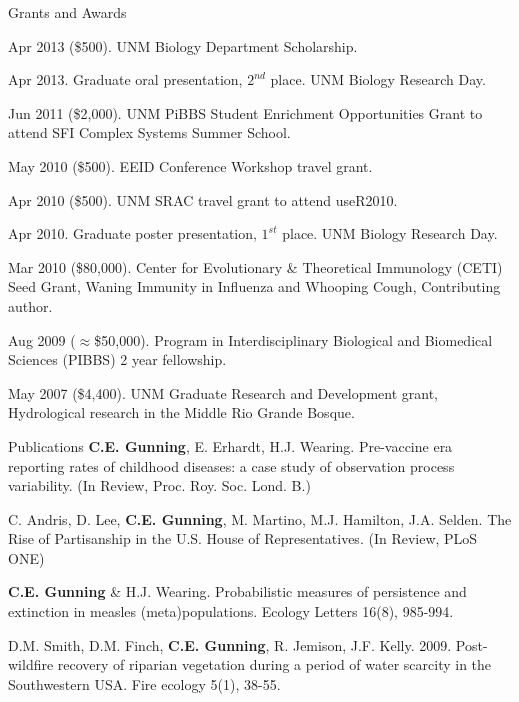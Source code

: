 \documentclass{resume} %
\begin{document}
\begin{rSection}{Grants and Awards}
\item Apr 2013 (\$500). UNM Biology Department Scholarship.
\item Apr 2013. Graduate oral presentation, $2^{nd}$ place. UNM Biology Research Day.
\item Jun 2011 (\$2,000). UNM PiBBS Student Enrichment Opportunities Grant to
attend SFI Complex Systems Summer School.
\item May 2010 (\$500). EEID Conference Workshop travel grant.
\item Apr 2010 (\$500). UNM SRAC travel grant to attend useR2010.
\item Apr 2010.  Graduate poster presentation, $1^{st}$ place. UNM Biology Research Day.
\item Mar 2010 (\$80,000). Center for Evolutionary \& Theoretical Immunology (CETI) Seed
Grant, Waning Immunity in Influenza and Whooping Cough,
Contributing author.
\item Aug 2009 ($\approx$\$50,000). Program in Interdisciplinary Biological and Biomedical
Sciences (PIBBS) 2 year fellowship.
\item May 2007 (\$4,400). UNM Graduate Research and Development grant, Hydrological
research in the Middle Rio Grande Bosque. 
\end{rSection}

\begin{rSection}{Publications}
{\bf C.E. Gunning}, E. Erhardt, H.J. Wearing.  Pre-vaccine era reporting rates
of childhood diseases: a case study of observation process variability.  (In
Review, Proc. Roy. Soc. Lond. B.)

C. Andris, D. Lee, {\bf C.E. Gunning}, M. Martino, M.J.  Hamilton, J.A. Selden.
The Rise of Partisanship in the U.S. House of Representatives.  (In Review, PLoS
ONE)

{\bf C.E. Gunning} \& H.J. Wearing. Probabilistic measures of persistence
and extinction in measles (meta)populations.  Ecology Letters 16(8), 985-994.

D.M. Smith, D.M. Finch, {\bf C.E. Gunning}, R. Jemison, J.F. Kelly. 2009. Post-wildfire recovery of riparian vegetation during a period of water scarcity in the Southwestern USA. Fire ecology 5(1), 38-55.
\end{rSection}
\end{document}
